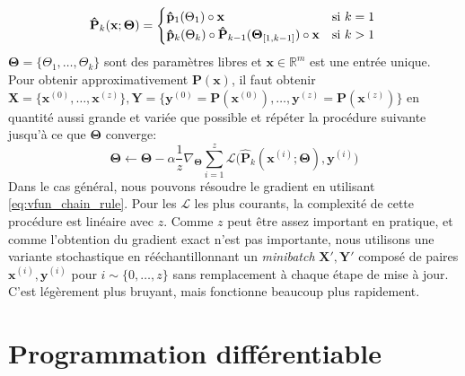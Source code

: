 %
\begin{equation} \label{eq:recursive_parametric_eq}
\mathbf{\hat P}_k(\mathbf{x}; \bm\Theta) = \begin{cases} \mathbf{\hat p}_1(\Theta_1)\circ\mathbf{x} &\text{si } k=1\\ \mathbf{\hat p}_k(\Theta_k)\circ \mathbf{\hat P}_{k-1}(\bm\Theta_{[1, k-1]})\circ\mathbf{x}&\text{si } k > 1 \end{cases} \\
\end{equation}
%
$\bm\Theta = \{\Theta_1, \dots, \Theta_k\}$ sont des paramètres libres et $\mathbf{x} \in \mathbb{R}^m$ est une entrée unique. Pour obtenir approximativement $\mathbf{P}(\mathbf x)$, il faut obtenir $\mathbf{X} = \{\mathbf{x}^{(0)}, \dots, \mathbf{x}^{(z)}\}, \mathbf{Y} = \{\mathbf{y}^{(0)} = \mathbf{P}(\mathbf{x}^{(0)}), \dots, \mathbf{y}^{(z)} = \mathbf{P}(\mathbf{x}^{(z)})\}$ en quantité aussi grande et variée que possible et répéter la procédure suivante jusqu'à ce que $\bm\Theta$ converge:
%
\begin{equation} \label{eq:stochastic_grad_descent}
\bm\Theta \leftarrow \bm\Theta - \alpha\frac{1}{z}\nabla_{\bm\Theta} \sum_{i=1}^z\mathcal{L}\big(\mathbf{\hat P}_k(\mathbf{x}^{(i)}; \bm\Theta), \mathbf{y}^{(i)}\big)
\end{equation}
%
Dans le cas général, nous pouvons résoudre le gradient en utilisant \autoref{eq:vfun_chain_rule}. Pour les $\mathcal{L}$ les plus courants, la complexité de cette procédure est linéaire avec $z$. Comme $z$ peut être assez important en pratique, et comme l'obtention du gradient exact n'est pas importante, nous utilisons une variante stochastique en rééchantillonnant un \textit{minibatch} $\mathbf{X}', \mathbf{Y}'$ composé de paires $\mathbf{x}^{(i)}, \mathbf{y}^{(i)}$ pour $i \sim \{0, \dots, z\}$ sans remplacement à chaque étape de mise à jour. C'est légèrement plus bruyant, mais fonctionne beaucoup plus rapidement.

\section{Programmation différentiable}\label{sec:differentiable-programming}

